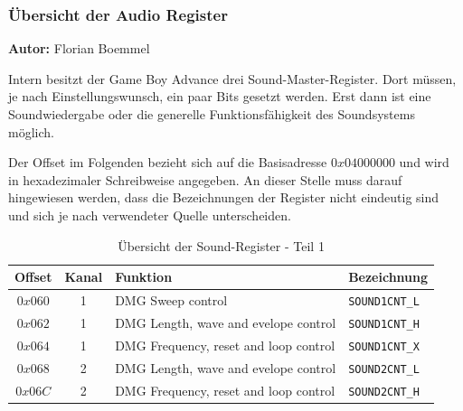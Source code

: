 \documentclass[11pt,a4paper]{scrartcl}
\newcommand{\AutorFlorian} {
    \vspace{-4mm}
    \large \textbf{Autor:} Florian Boemmel \normalsize
    \vspace{2mm}
}
\begin{document}

\subsubsection{\"Ubersicht der Audio Register}
\AutorFlorian

Intern besitzt der Game Boy Advance drei Sound-Master-Register. Dort m\"ussen, je nach Einstellungswunsch, ein paar Bits gesetzt werden. Erst dann ist eine Soundwiedergabe oder die generelle Funktionsf\"ahigkeit des Soundsystems m\"oglich. \cite{GameBoySoundsystem}

Der Offset im Folgenden bezieht sich auf die Basisadresse $0x04000000$ und wird in hexadezimaler Schreibweise angegeben. An dieser Stelle muss darauf hingewiesen werden, dass die Bezeichnungen der Register nicht eindeutig sind und sich je nach verwendeter Quelle unterscheiden.

\begin{table}[h]
    \centering
    \begin{tabular}{ c | c | p{10cm} | l }
        \textbf{Offset} & \textbf{Kanal} & \textbf{Funktion} & \textbf{Bezeichnung} \\
        \hline
        $0x060$ & 1 & DMG Sweep control & \verb|SOUND1CNT_L| \\
        \hline
        $0x062$ & 1 & DMG Length, wave and evelope control & \verb|SOUND1CNT_H| \\
        \hline
        $0x064$ & 1 & DMG Frequency, reset and loop control & \verb|SOUND1CNT_X| \\
        \hline
        $0x068$ & 2 & DMG Length, wave and evelope control & \verb|SOUND2CNT_L| \\
        \hline
        $0x06C$ & 2 & DMG Frequency, reset and loop control & \verb|SOUND2CNT_H| \\
    \end{tabular}
    \caption{\"Ubersicht der Sound-Register - Teil 1}
    \label{table:SoundRegister1}
\end{table}

\newpage
\end{document}
